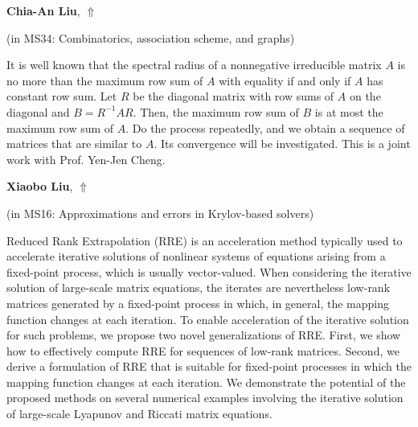 \documentclass[ILAS2025-program.tex]{subfiles}
\begin{document}
\hypertarget{down0287}{}\begin{ilasabstract}
    
\textbf{Chia-An Liu},  \hfill \hyperlink{up0287}{$\Uparrow$}
    
    
(in {\color{mstitle}MS34: Combinatorics, association scheme, and graphs})
        
\mtskip
    It is well known that the spectral radius of a nonnegative irreducible matrix $A$ is no more than the maximum row sum of $A$ with equality if and only if $A$ has constant row sum. Let $R$ be the diagonal matrix with row sums of $A$ on the diagonal and $B=R^{-1}AR.$ Then, the maximum row sum of $B$ is at most the maximum row sum of $A$. Do the process repeatedly, and we obtain a sequence of matrices that are similar to $A$. Its convergence will be investigated. This is a joint work with Prof. Yen-Jen Cheng.

\end{ilasabstract}
    

\hypertarget{down0302}{}\begin{ilasabstract}
    
\textbf{Xiaobo Liu},  \hfill \hyperlink{up0302}{$\Uparrow$}
    
    
(in {\color{mstitle}MS16: Approximations and errors in Krylov-based solvers})
        
\mtskip
    Reduced Rank Extrapolation (RRE) is an acceleration method typically used to  accelerate iterative solutions of nonlinear systems of equations arising from a fixed-point process, which is usually vector-valued.
When considering the iterative solution of large-scale matrix equations, the iterates are nevertheless low-rank matrices generated by a fixed-point process in which, in general, the mapping function changes at each iteration.
To enable acceleration of the iterative solution for such problems, we propose two novel generalizations of RRE.
First, we show how to effectively compute RRE for sequences of low-rank matrices.
Second, we derive a formulation of RRE that is suitable for fixed-point processes in which the mapping function changes at each iteration.
We demonstrate the potential of the proposed methods on several numerical examples involving the iterative solution of large-scale Lyapunov and Riccati matrix equations.


\end{ilasabstract}
    
\end{document}
